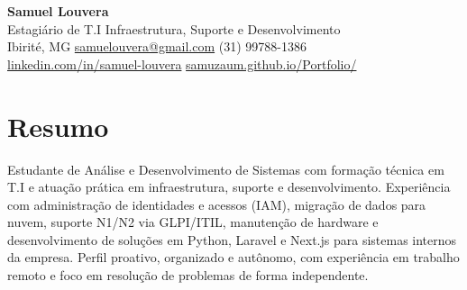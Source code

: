 \documentclass[11pt,a4paper]{article}
\begin{document}
{\LARGE\bfseries\color{accent} Samuel Louvera}\\[3pt]
{\large Estagiário de T.I \textbar{} Infraestrutura, Suporte e Desenvolvimento}\\[5pt]
Ibirité, MG \quad\textbullet\quad
\href{mailto:samuelouvera@gmail.com}{samuelouvera@gmail.com} \quad\textbullet\quad
(31) 99788-1386\\
\href{https://linkedin.com/in/samuel-louvera}{linkedin.com/in/samuel-louvera} \quad\textbullet\quad
\href{https://samuzaum.github.io/Portfolio/}{samuzaum.github.io/Portfolio/}

\section{Resumo}
Estudante de Análise e Desenvolvimento de Sistemas com formação técnica em T.I e atuação prática em
infraestrutura, suporte e desenvolvimento. Experiência com administração de identidades e acessos (IAM),
migração de dados para nuvem, suporte N1/N2 via GLPI/ITIL, manutenção de hardware e desenvolvimento
de soluções em Python, Laravel e Next.js para sistemas internos da empresa. Perfil proativo, organizado
e autônomo, com experiência em trabalho remoto e foco em resolução de problemas de forma independente.

\end{document}
